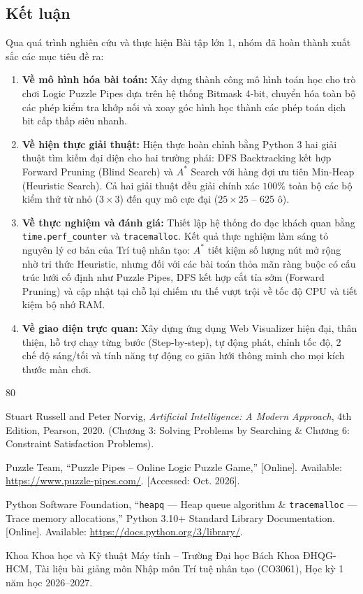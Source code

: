\documentclass[a4paper]{article}
\begin{document}
\subsection{Kết luận}
Qua quá trình nghiên cứu và thực hiện Bài tập lớn 1, nhóm đã hoàn thành xuất sắc các mục tiêu đề ra:
\begin{enumerate}
    \item \textbf{Về mô hình hóa bài toán:} Xây dựng thành công mô hình toán học cho trò chơi Logic Puzzle Pipes dựa trên hệ thống Bitmask 4-bit, chuyển hóa toàn bộ các phép kiểm tra khớp nối và xoay góc hình học thành các phép toán dịch bit cấp thấp siêu nhanh.
    \item \textbf{Về hiện thực giải thuật:} Hiện thực hoàn chỉnh bằng Python 3 hai giải thuật tìm kiếm đại diện cho hai trường phái: DFS Backtracking kết hợp Forward Pruning (Blind Search) và $A^*$ Search với hàng đợi ưu tiên Min-Heap (Heuristic Search). Cả hai giải thuật đều giải chính xác $100\%$ toàn bộ các bộ kiểm thử từ nhỏ ($3 \times 3$) đến quy mô cực đại ($25 \times 25$ -- 625 ô).
    \item \textbf{Về thực nghiệm và đánh giá:} Thiết lập hệ thống đo đạc khách quan bằng \texttt{time.perf\_counter} và \texttt{tracemalloc}. Kết quả thực nghiệm làm sáng tỏ nguyên lý cơ bản của Trí tuệ nhân tạo: $A^*$ tiết kiệm số lượng nút mở rộng nhờ tri thức Heuristic, nhưng đối với các bài toán thỏa mãn ràng buộc có cấu trúc lưới cố định như Puzzle Pipes, DFS kết hợp cắt tỉa sớm (Forward Pruning) và cập nhật tại chỗ lại chiếm ưu thế vượt trội về tốc độ CPU và tiết kiệm bộ nhớ RAM.
    \item \textbf{Về giao diện trực quan:} Xây dựng ứng dụng Web Visualizer hiện đại, thân thiện, hỗ trợ chạy từng bước (Step-by-step), tự động phát, chỉnh tốc độ, 2 chế độ sáng/tối và tính năng tự động co giãn lưới thông minh cho mọi kích thước màn chơi.
\end{enumerate}

\newpage
\begin{thebibliography}{80}

Stuart Russell and Peter Norvig, \textit{Artificial Intelligence: A Modern Approach}, 4th Edition, Pearson, 2020. (Chương 3: Solving Problems by Searching \& Chương 6: Constraint Satisfaction Problems).

Puzzle Team, ``Puzzle Pipes -- Online Logic Puzzle Game,'' [Online]. Available: \url{https://www.puzzle-pipes.com/}. [Accessed: Oct. 2026].

Python Software Foundation, ``\texttt{heapq} --- Heap queue algorithm \& \texttt{tracemalloc} --- Trace memory allocations,'' Python 3.10+ Standard Library Documentation. [Online]. Available: \url{https://docs.python.org/3/library/}.

Khoa Khoa học và Kỹ thuật Máy tính -- Trường Đại học Bách Khoa ĐHQG-HCM, Tài liệu bài giảng môn Nhập môn Trí tuệ nhân tạo (CO3061), Học kỳ 1 năm học 2026--2027.

\end{thebibliography}
\end{document}
